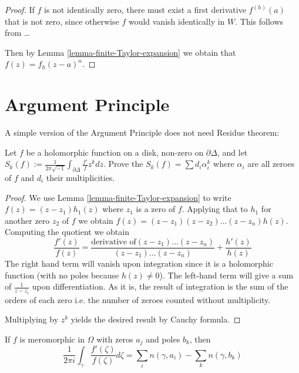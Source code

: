 \begin{proof}
If $f$ is not identically zero, there must exist a first derivative $f^{
(h)}(a)$ that is not zero, since otherwise $f$ would vanish identically in $W$.
This follows from … 

Then by Lemma \ref{lemma-finite-Taylor-expansion} we obtain that
$f(z)=f_h(z-a)^n$.
\end{proof}

\section{Argument Principle}
\label{section-argument-principle}

A simple version of the Argument Principle does not need Residue theorem:

\begin{exercise}
\label{exercise-argument-principle}
Let $f$ be a holomorphic function on a disk, non-zero on $\partial \Delta$, and
let $S_k(f):=\frac{1}{2\pi\sqrt{-1}}\int_{\partial\Delta}\frac{f'}{f}z^kdz$.
Prove the $S_k(f)=\sum d_i\alpha_i^k$ where $\alpha_i$ are all zeroes of $f$ and
$d_i$ their multiplicities.
\end{exercise}

\begin{proof}
We use Lemma \ref{lemma-finite-Taylor-expansion} to write
$f(z)=(z-z_1)h_1(z)$ where $z_1$ is a zero of $f$. Applying that to $h_1$ for
another zero  $z_2$ of $f$ we obtain 
$f(z)=(z-z_1)(z-z_2)\ldots(z-z_n)h(z)$. Computing the quotient we obtain
$$
\frac{f'(z)}{f(z)}=\frac{\text{derivative of
$(z-z_1)\ldots(z-z_n)$}}{(z-z_1)\ldots(z-z_n)}+\frac{h'(z)}{h(z)}
$$
The right hand term will vanish upon integration since it is a holomorphic
function (with no poles because $h(z)\neq 0$). The left-hand term will give a
sum of $\frac{1}{z-z_i}$ upon differentiation. As it is, the result of
integration is the sum of the orders of each zero i.e. the number of zeroes
counted without multiplicity.

Multiplying by $z^k$ yields the desired result by Cauchy formula.
\end{proof}

\begin{theorem}
\label{theorem-argument-principle-and-Rouche-theorem}
\begin{reference}
\cite[Chapter 5, Theorem 18]{ahl}
\end{reference}
If $f$ is meromorphic in $\Omega$ with zeros $a_j$ and poles $b_k$, then
\begin{equation}
\label{equation-argument-principle}
\frac{1}{2\pi i}\int_\gamma\frac{f'(\zeta)}{f(\zeta)}d\zeta
=\sum_{i}n(\gamma,a_i)-\sum_{k}n(\gamma,b_k)
\end{equation}
\end{theorem}

